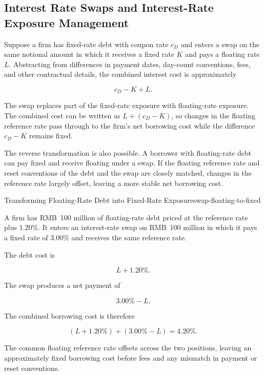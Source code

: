\subsection[Interest Rate Swaps and Interest-Rate Exposure Management]{Interest Rate Swaps and Interest-Rate Exposure Management}

Suppose a firm has fixed-rate debt with coupon rate $c_D$ and enters a swap on the same notional amount in which it receives a fixed rate $K$ and pays a floating rate $L$. Abstracting from differences in payment dates, day-count conventions, fees, and other contractual details, the combined interest cost is approximately

\begin{equation}
c_D-K+L.
\label{eq:ch17-fixed-debt-to-floating}
\end{equation}

The swap replaces part of the fixed-rate exposure with floating-rate exposure. The combined cost can be written as $L+(c_D-K)$, so changes in the floating reference rate pass through to the firm's net borrowing cost while the difference $c_D-K$ remains fixed.

The reverse transformation is also possible. A borrower with floating-rate debt can pay fixed and receive floating under a swap. If the floating reference rate and reset conventions of the debt and the swap are closely matched, changes in the reference rate largely offset, leaving a more stable net borrowing cost.

\begin{example}{Transforming Floating-Rate Debt into Fixed-Rate Exposure}{swap-floating-to-fixed}

A firm has RMB~100 million of floating-rate debt priced at the reference rate plus 1.20\%. It enters an interest-rate swap on RMB~100 million in which it pays a fixed rate of 3.00\% and receives the same reference rate.

The debt cost is

\[
L+1.20\%.
\]

The swap produces a net payment of

\[
3.00\%-L.
\]

The combined borrowing cost is therefore

\[
(L+1.20\%)+(3.00\%-L)
=
4.20\%.
\]

The common floating reference rate offsets across the two positions, leaving an approximately fixed borrowing cost before fees and any mismatch in payment or reset conventions.

\end{example}

